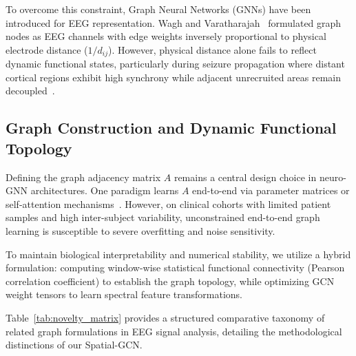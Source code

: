 \documentclass[journal]{IEEEtran}
\begin{document}
To overcome this constraint, Graph Neural Networks (GNNs) have been introduced for EEG representation. Wagh and Varatharajah~\cite{wagh} formulated graph nodes as EEG channels with edge weights inversely proportional to physical electrode distance ($1/d_{ij}$). However, physical distance alone fails to reflect dynamic functional states, particularly during seizure propagation where distant cortical regions exhibit high synchrony while adjacent unrecruited areas remain decoupled~\cite{bartolomei, kramer}.

\subsection{Graph Construction and Dynamic Functional Topology}
Defining the graph adjacency matrix $A$ remains a central design choice in neuro-GNN architectures. One paradigm learns $A$ end-to-end via parameter matrices or self-attention mechanisms~\cite{song, jang}. However, on clinical cohorts with limited patient samples and high inter-subject variability, unconstrained end-to-end graph learning is susceptible to severe overfitting and noise sensitivity.

To maintain biological interpretability and numerical stability, we utilize a hybrid formulation: computing window-wise statistical functional connectivity (Pearson correlation coefficient) to establish the graph topology, while optimizing GCN weight tensors to learn spectral feature transformations. 

Table~\ref{tab:novelty_matrix} provides a structured comparative taxonomy of related graph formulations in EEG signal analysis, detailing the methodological distinctions of our Spatial-GCN.
\end{document}
